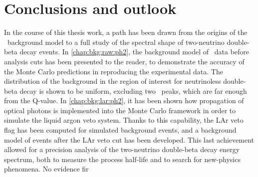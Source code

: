 
\chapter*{Conclusions and outlook}%
\label{chap:concl}

In the course of this thesis work, a path has been drawn from the origins of the \gerda\
background model to a full study of the spectral shape of two-neutrino double-beta decay
events. In \cref{chap:bkg:raw:ph2}, the background model of \gerdatwo\ data before
analysis cuts has been presented to the reader, to demonstrate the accuracy of the Monte
Carlo predictions in reproducing the experimental data. The distribution of the background
in the region of interest for neutrinoless double-beta decay is shown to be uniform,
excluding two \g\ peaks, which are far enough from the Q-value. In
\cref{chap:bkg:lar:ph2}, it has been shown how propagation of optical photons is
implemented into the Monte Carlo framework in order to simulate the liquid argon veto
system. Thanks to this capability, the LAr veto flag has been computed for simulated
background events, and a background model of events after the LAr veto cut has been
developed. This last achievement allowed for a precision analysis of the two-neutrino
double-beta decay energy spectrum, both to measure the process half-life and to search for
new-physics phenomena. No evidence fir

